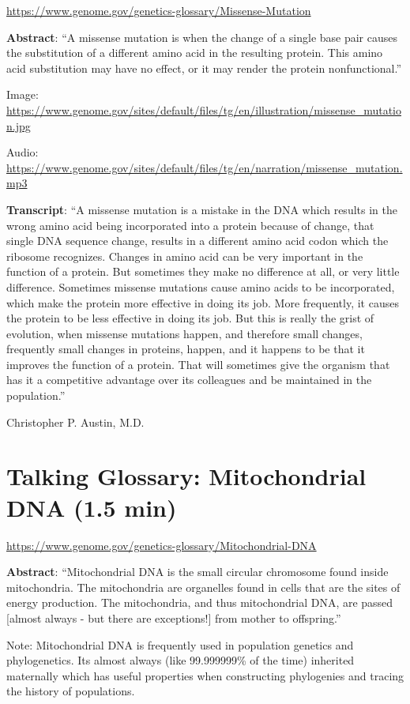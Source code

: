 \documentclass[
]{book}
\begin{document}
\url{https://www.genome.gov/genetics-glossary/Missense-Mutation}

\textbf{Abstract}: ``A missense mutation is when the change of a single base pair causes the substitution of a different amino acid in the resulting protein. This amino acid substitution may have no effect, or it may render the protein nonfunctional.''

Image: \url{https://www.genome.gov/sites/default/files/tg/en/illustration/missense_mutation.jpg}

Audio: \url{https://www.genome.gov/sites/default/files/tg/en/narration/missense_mutation.mp3}

\textbf{Transcript}: ``A missense mutation is a mistake in the DNA which results in the wrong amino acid being incorporated into a protein because of change, that single DNA sequence change, results in a different amino acid codon which the ribosome recognizes. Changes in amino acid can be very important in the function of a protein. But sometimes they make no difference at all, or very little difference. Sometimes missense mutations cause amino acids to be incorporated, which make the protein more effective in doing its job. More frequently, it causes the protein to be less effective in doing its job. But this is really the grist of evolution, when missense mutations happen, and therefore small changes, frequently small changes in proteins, happen, and it happens to be that it improves the function of a protein. That will sometimes give the organism that has it a competitive advantage over its colleagues and be maintained in the population.''

Christopher P. Austin, M.D.

\hypertarget{talking-glossary-mitochondrial-dna-1.5-min}{%
\section{Talking Glossary: Mitochondrial DNA (1.5 min)}\label{talking-glossary-mitochondrial-dna-1.5-min}}

\url{https://www.genome.gov/genetics-glossary/Mitochondrial-DNA}

\textbf{Abstract}: ``Mitochondrial DNA is the small circular chromosome found inside mitochondria. The mitochondria are organelles found in cells that are the sites of energy production. The mitochondria, and thus mitochondrial DNA, are passed {[}almost always - but there are exceptions!{]} from mother to offspring.''

Note: Mitochondrial DNA is frequently used in population genetics and phylogenetics. Its almost always (like 99.999999\% of the time) inherited maternally which has useful properties when constructing phylogenies and tracing the history of populations.
\end{document}
